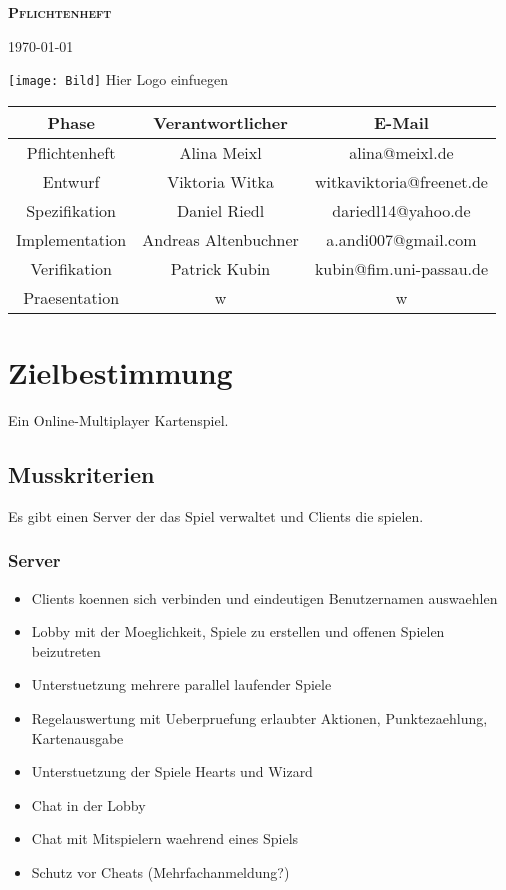 \documentclass{article}
\begin{document}
\begin{titlepage}

\begin{center}
\textbf{\textsc{\LARGE Pflichtenheft}}

{\large \today}

\vspace{6cm}
\texttt{[image: Bild]}
Hier Logo einfuegen

\vspace{6cm}

\begin{tabular}{|c|c|c|}\hline
   Phase & Verantwortlicher & E-Mail \\ \hline\hline
   Pflichtenheft & Alina  Meixl  &  alina@meixl.de \\ \hline
   Entwurf & Viktoria Witka & witkaviktoria@freenet.de \\ \hline
   Spezifikation & Daniel Riedl & dariedl14@yahoo.de \\ \hline
   Implementation & Andreas Altenbuchner& a.andi007@gmail.com\\ \hline
   Verifikation &Patrick Kubin & kubin@fim.uni-passau.de\\ \hline
   Praesentation & w& w\\ \hline
 \end{tabular}

\end{center}

\end{titlepage}


\tableofcontents
\newpage

\section{Zielbestimmung}
Ein Online-Multiplayer Kartenspiel.

\subsection{Musskriterien}
Es gibt einen Server der das Spiel verwaltet und Clients die spielen.
\subsubsection{Server}
\begin{itemize}
	\item Clients koennen sich verbinden und eindeutigen Benutzernamen auswaehlen
	\item Lobby mit der Moeglichkeit, Spiele zu erstellen und offenen Spielen beizutreten
	\item Unterstuetzung mehrere parallel laufender Spiele
	\item Regelauswertung mit Ueberpruefung erlaubter Aktionen, Punktezaehlung, Kartenausgabe
	\item Unterstuetzung der Spiele Hearts und Wizard
	\item Chat in der Lobby
	\item Chat mit Mitspielern waehrend eines Spiels
	\item Schutz vor Cheats (Mehrfachanmeldung?)
\end{itemize}
\end{document}
